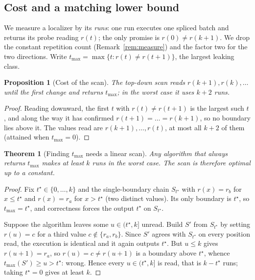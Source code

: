 \documentclass[11pt]{article}
\theoremstyle{definition}
\theoremstyle{plain}
\newtheorem{theorem}{Theorem}
\newtheorem{proposition}{Proposition}
\newcommand{\tmax}{t_{\max}}
\begin{document}
\subsection*{Cost and a matching lower bound}

We measure a localizer by its \emph{runs}: one run executes one spliced batch and
returns its probe reading $r(t)$; the only promise is $r(0)\neq r(k+1)$. We drop the
constant repetition count (Remark~\ref{rem:measure}) and the factor two for the two
directions. Write $\tmax=\max\{t: r(t)\neq r(t+1)\}$, the largest leaking class.

\begin{proposition}[Cost of the scan]
\label{prop:scancost}
The top-down scan reads $r(k+1),r(k),\dots$ until the first change and returns $\tmax$;
in the worst case it uses $k+2$ runs.
\end{proposition}

\begin{proof}
Reading downward, the first $t$ with $r(t)\neq r(t+1)$ is the largest such $t$, and
along the way it has confirmed $r(t+1)=\dots=r(k+1)$, so no boundary lies above it. The
values read are $r(k+1),\dots,r(t)$, at most all $k+2$ of them (attained when
$\tmax=0$).
\end{proof}

\begin{theorem}[Finding $\tmax$ needs a linear scan]
\label{thm:lb-scan}
Any algorithm that always returns $\tmax$ makes at least $k$ runs in the worst case. The
scan is therefore optimal up to a constant.
\end{theorem}

\begin{proof}
Fix $t^\star\in\{0,\dots,k\}$ and the single-boundary chain $S_{t^\star}$ with
$r(x)=r_b$ for $x\le t^\star$ and $r(x)=r_a$ for $x>t^\star$ (two distinct values). Its
only boundary is $t^\star$, so $\tmax=t^\star$, and correctness forces the output
$t^\star$ on $S_{t^\star}$.

Suppose the algorithm leaves some $u\in(t^\star,k]$ unread. Build $S'$ from
$S_{t^\star}$ by setting $r(u)=c$ for a third value $c\notin\{r_a,r_b\}$. Since $S'$
agrees with $S_{t^\star}$ on every position read, the execution is identical and it
again outputs $t^\star$. But $u\le k$ gives $r(u+1)=r_a$, so $r(u)=c\neq r(u+1)$ is a
boundary above $t^\star$, whence $\tmax(S')\ge u>t^\star$: wrong. Hence every
$u\in(t^\star,k]$ is read, that is $k-t^\star$ runs; taking $t^\star=0$ gives at least
$k$.
\end{proof}
\end{document}
